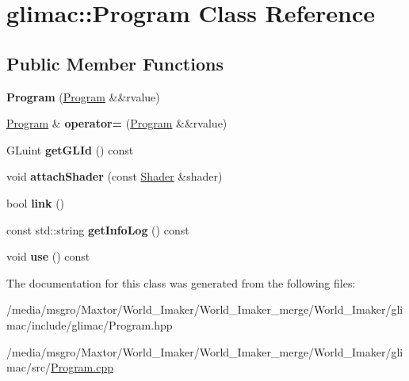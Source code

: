 \hypertarget{classglimac_1_1Program}{}\section{glimac\+:\+:Program Class Reference}
\label{classglimac_1_1Program}
\subsection*{Public Member Functions}
\begin{DoxyCompactItemize}
\item 
\mbox{\label{classglimac_1_1Program_aad59ed1f53824eda09b95fd1acdce674}} 
{\bfseries Program} (\hyperlink{classglimac_1_1Program}{Program} \&\&rvalue)
\item 
\mbox{\label{classglimac_1_1Program_a3ee1eac00a2e3fa4b6bab51d4333f33c}} 
\hyperlink{classglimac_1_1Program}{Program} \& {\bfseries operator=} (\hyperlink{classglimac_1_1Program}{Program} \&\&rvalue)
\item 
\mbox{\label{classglimac_1_1Program_ab1a519d005c77ba44876d1f309b38d18}} 
G\+Luint {\bfseries get\+G\+L\+Id} () const
\item 
\mbox{\label{classglimac_1_1Program_a5aac165d28cd6f704c01a3e0eee2119d}} 
void {\bfseries attach\+Shader} (const \hyperlink{classglimac_1_1Shader}{Shader} \&shader)
\item 
\mbox{\label{classglimac_1_1Program_a2f32f4f66ff9742750418f6fda054931}} 
bool {\bfseries link} ()
\item 
\mbox{\label{classglimac_1_1Program_aaf1769457ca41bca4afad7ecf90e9c3f}} 
const std\+::string {\bfseries get\+Info\+Log} () const
\item 
\mbox{\label{classglimac_1_1Program_a825cb4d58cccdf849730191ae5e118c6}} 
void {\bfseries use} () const
\end{DoxyCompactItemize}


The documentation for this class was generated from the following files\+:\begin{DoxyCompactItemize}
\item 
/media/msgro/\+Maxtor/\+World\+\_\+\+Imaker/\+World\+\_\+\+Imaker\+\_\+merge/\+World\+\_\+\+Imaker/glimac/include/glimac/Program.\+hpp\item 
/media/msgro/\+Maxtor/\+World\+\_\+\+Imaker/\+World\+\_\+\+Imaker\+\_\+merge/\+World\+\_\+\+Imaker/glimac/src/\hyperlink{Program_8cpp}{Program.\+cpp}\end{DoxyCompactItemize}
